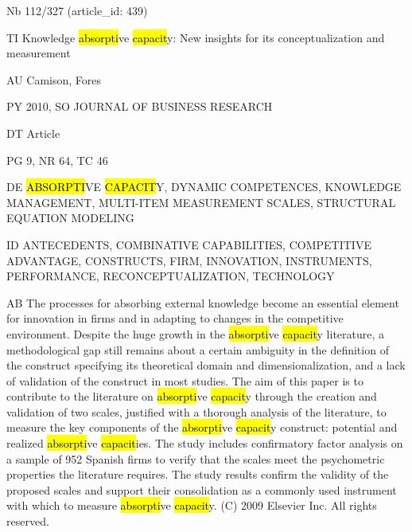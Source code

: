 \documentclass[a4paper]{article}
\begin{document}
\vspace*{-2cm}
Nb \tabto{0cm}112/327 (article\_id: 439)\par
TI \tabto{0cm}Knowledge \hl{absorpti}ve \hl{capacit}y: New insights for its conceptualization and measurement\par
AU \tabto{0cm}Camison, Fores\par
PY \tabto{0cm}2010, SO JOURNAL OF BUSINESS RESEARCH\par
DT \tabto{0cm}Article\par
PG \tabto{0cm}9, NR 64, TC 46\par
DE \tabto{0cm}\hl{ABSORPTI}VE \hl{CAPACIT}Y, DYNAMIC COMPETENCES, KNOWLEDGE MANAGEMENT, MULTI-ITEM MEASUREMENT SCALES, STRUCTURAL EQUATION MODELING\par
ID \tabto{0cm}ANTECEDENTS, COMBINATIVE CAPABILITIES, COMPETITIVE ADVANTAGE, CONSTRUCTS, FIRM, INNOVATION, INSTRUMENTS, PERFORMANCE, RECONCEPTUALIZATION, TECHNOLOGY\par
AB \tabto{0cm}The processes for absorbing external knowledge become an essential element for innovation in firms and in adapting to changes in the competitive environment. Despite the huge growth in the \hl{absorpti}ve \hl{capacit}y literature, a methodological gap still remains about a certain ambiguity in the definition of the construct specifying its theoretical domain and dimensionalization, and a lack of validation of the construct in most studies. The aim of this paper is to contribute to the literature on \hl{absorpti}ve \hl{capacit}y through the creation and validation of two scales, justified with a thorough analysis of the literature, to measure the key components of the \hl{absorpti}ve \hl{capacit}y construct: potential and realized \hl{absorpti}ve \hl{capacit}ies. The study includes confirmatory factor analysis on a sample of 952 Spanish firms to verify that the scales meet the psychometric properties the literature requires. The study results confirm the validity of the proposed scales and support their consolidation as a commonly used instrument with which to measure \hl{absorpti}ve \hl{capacit}y. (C) 2009 Elsevier Inc. All rights reserved.\par
\clearpage
\end{document}
